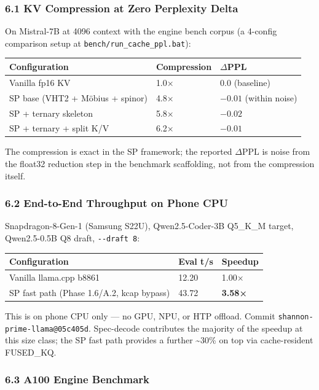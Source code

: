 \documentclass[
  11pt,
]{article}
\begin{document}
\hypertarget{kv-compression-at-zero-perplexity-delta}{%
\subsubsection{6.1 KV Compression at Zero Perplexity
Delta}\label{kv-compression-at-zero-perplexity-delta}}

On Mistral-7B at 4096 context with the engine bench corpus (a 4-config
comparison setup at \texttt{bench/run\_cache\_ppl.bat}):

\begin{longtable}[]{@{}lll@{}}
\toprule
Configuration & Compression & \(\Delta\)PPL\tabularnewline
\midrule
\endhead
Vanilla fp16 KV & 1.0× & 0.0 (baseline)\tabularnewline
SP base (VHT2 + Möbius + spinor) & 4.8× & \(-0.01\) (within
noise)\tabularnewline
SP + ternary skeleton & 5.8× & \(-0.02\)\tabularnewline
SP + ternary + split K/V & 6.2× & \(-0.01\)\tabularnewline
\bottomrule
\end{longtable}

The compression is exact in the SP framework; the reported \(\Delta\)PPL
is noise from the float32 reduction step in the benchmark scaffolding,
not from the compression itself.

\hypertarget{end-to-end-throughput-on-phone-cpu}{%
\subsubsection{6.2 End-to-End Throughput on Phone
CPU}\label{end-to-end-throughput-on-phone-cpu}}

Snapdragon-8-Gen-1 (Samsung S22U), Qwen2.5-Coder-3B Q5\_K\_M target,
Qwen2.5-0.5B Q8 draft, \texttt{-\/-draft\ 8}:

\begin{longtable}[]{@{}lll@{}}
\toprule
Configuration & Eval t/s & Speedup\tabularnewline
\midrule
\endhead
Vanilla llama.cpp b8861 & 12.20 & 1.00×\tabularnewline
SP fast path (Phase 1.6/A.2, kcap bypass) & 43.72 &
\textbf{3.58×}\tabularnewline
\bottomrule
\end{longtable}

This is on phone CPU only --- no GPU, NPU, or HTP offload. Commit
\texttt{shannon-prime-llama@05c405d}. Spec-decode contributes the
majority of the speedup at this size class; the SP fast path provides a
further \textasciitilde30\% on top via cache-resident FUSED\_KQ.

\hypertarget{a100-engine-benchmark}{%
\subsubsection{6.3 A100 Engine Benchmark}\label{a100-engine-benchmark}}
\end{document}
